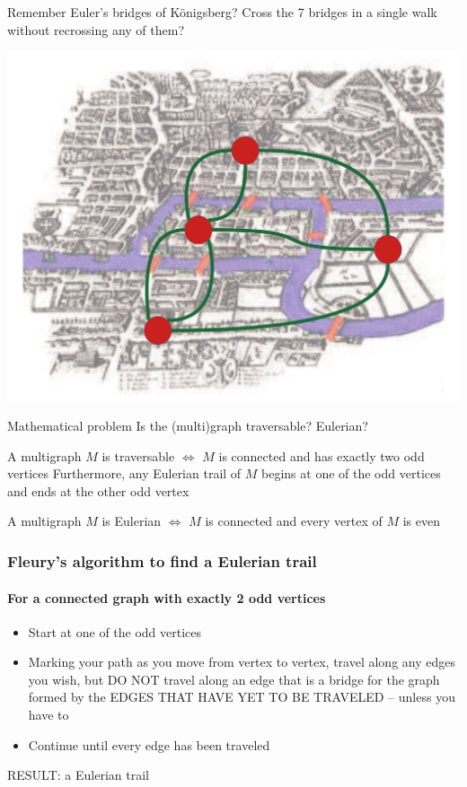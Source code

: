 \documentclass[aspectratio=169]{beamer}\usepackage[]{graphicx}\usepackage[]{xcolor}
\begin{document}
\begin{frame}{Remember Euler's bridges of K\"onigsberg?}
	Cross the 7 bridges in a single walk without recrossing any of them?
	\begin{center}
	\includegraphics[width=.7\textwidth]{FIGS_slides/bridge_color_with_graph}
	\end{center}
	\begin{block}{Mathematical problem}
		Is the (multi)graph traversable? Eulerian?
	\end{block}
	\end{frame}


\begin{frame}
\begin{theorem}
	A multigraph $M$ is traversable $\iff$ $M$ is connected and has exactly two odd vertices
	\vskip0.2cm
	Furthermore, any Eulerian trail of $M$ begins at one of the odd vertices and ends at the other odd vertex
\end{theorem}
\vfill
\begin{theorem}
	A multigraph $M$ is Eulerian $\iff$ $M$ is connected and every vertex of $M$ is even
\end{theorem}
\end{frame}




\begin{frame}
	\frametitle{Fleury's algorithm to find a Eulerian trail}
	\framesubtitle{For a connected graph with exactly 2 odd vertices}
\begin{itemize}
	\item Start at one of the odd vertices
	\item Marking your path as you move from vertex to vertex, travel along any edges you wish, but DO NOT travel along an edge that is a bridge for the graph formed by the EDGES THAT HAVE YET TO BE TRAVELED -- unless you have to
	\item Continue until every edge has been traveled
\end{itemize}
RESULT: a Eulerian trail
\end{frame}
\end{document}
